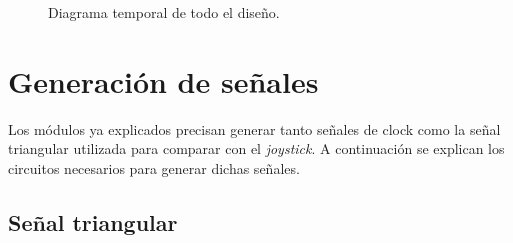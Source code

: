 \documentclass[11pt, a4paper]{article}
\begin{document}
%
\begin{figure}[H]
	\centering
	\caption{Diagrama temporal de todo el diseño.}
	\label{fig:diag_temp_total}
\end{figure}
%
\newpage
\section{Generaci\'on de señales}
Los m\'odulos ya explicados precisan generar tanto señales de clock como la señal triangular utilizada para comparar con el \textit{joystick}.
A continuaci\'on se explican los circuitos necesarios para generar dichas señales.
\subsection{Señal triangular}
%
\end{document}
